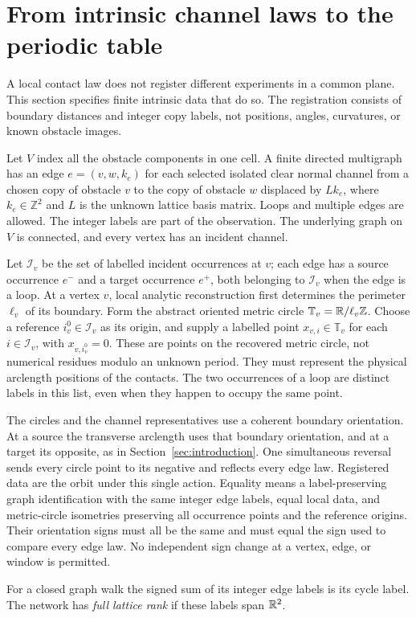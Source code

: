 \section{From intrinsic channel laws to the periodic table}
\label{sec:global}
A local contact law does not register different experiments in a common
plane. This section specifies finite intrinsic data that do so. The
registration consists of boundary distances and integer copy labels,
not positions, angles, curvatures, or known obstacle images.

\begin{definition}\label{def:network}
Let $V$ index all the obstacle components in one cell. A finite directed
multigraph has an edge $e=(v,w,k_e)$ for each selected isolated clear
normal channel from a chosen copy of obstacle $v$ to the copy of obstacle
$w$ displaced by $Lk_e$, where $k_e\in\mathbb Z^2$ and $L$ is the
unknown lattice basis matrix. Loops and multiple edges are allowed.
The integer labels are part of the observation. The underlying graph
on $V$ is connected, and every vertex has an incident channel.

Let $\mathcal I_v$ be the set of labelled incident occurrences at $v$;
each edge has a source occurrence $e^-$ and a target occurrence $e^+$,
both belonging to $\mathcal I_v$ when the edge is a loop.
At a vertex $v$, local analytic reconstruction first determines the
perimeter $\ell_v$ of its boundary. Form the abstract oriented metric
circle $\mathbb T_v=\mathbb R/\ell_v\mathbb Z$. Choose a reference
$i_v^0\in\mathcal I_v$ as its origin, and supply a labelled point
$x_{v,i}\in\mathbb T_v$ for each $i\in\mathcal I_v$, with
$x_{v,i_v^0}=0$. These are points
on the recovered metric circle, not numerical residues modulo an
unknown period. They must represent the physical arclength positions of
the contacts. The two occurrences of a loop are distinct labels in this
list, even when they happen to occupy the same point.

The circles and the channel representatives use a coherent boundary
orientation. At a source the transverse arclength uses that boundary
orientation, and at a target its opposite, as in
Section~\ref{sec:introduction}. One simultaneous reversal sends every
circle point to its negative and reflects every edge law. Registered
data are the orbit under this single action. Equality means a
label-preserving graph identification with the same integer edge labels,
equal local data, and metric-circle isometries preserving all occurrence
points and the reference origins. Their orientation signs must all be
the same and must equal the sign used to compare every edge law. No
independent sign change at a vertex, edge, or window is permitted.

For a closed graph walk the signed sum of its integer edge labels is
its cycle label. The network has \emph{full lattice rank} if these labels
span $\mathbb R^2$.
\end{definition}


